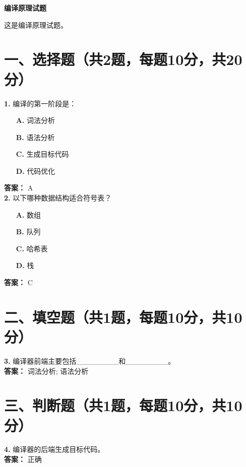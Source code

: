 \documentclass[12pt]{article}
\begin{document}
\begin{center}
\LARGE\textbf{编译原理试题}
\end{center}
\vspace{0.5cm}
这是编译原理试题。
\vspace{0.5cm}
\section*{一、选择题（共2题，每题10分，共20分）}
\noindent\textbf{1.} 编译的第一阶段是：\\[0.2em]
\begin{itemize}[label=~]
\item[\textbf{A.}] 词法分析
\item[\textbf{B.}] 语法分析
\item[\textbf{C.}] 生成目标代码
\item[\textbf{D.}] 代码优化
\end{itemize}
\textbf{答案：} A\\[0.5em]
\noindent\textbf{2.} 以下哪种数据结构适合符号表？\\[0.2em]
\begin{itemize}[label=~]
\item[\textbf{A.}] 数组
\item[\textbf{B.}] 队列
\item[\textbf{C.}] 哈希表
\item[\textbf{D.}] 栈
\end{itemize}
\textbf{答案：} C\\[0.5em]
\section*{二、填空题（共1题，每题10分，共10分）}
\noindent\textbf{3.} 编译器前端主要包括\_\_\_\_\_\_\_\_和\_\_\_\_\_\_\_\_。\\[0.2em]
\textbf{答案：} 词法分析; 语法分析\\[0.5em]
\section*{三、判断题（共1题，每题10分，共10分）}
\noindent\textbf{4.} 编译器的后端生成目标代码。\\[0.2em]
\textbf{答案：} 正确\\[0.5em]
\end{document}

